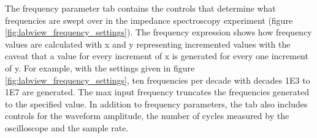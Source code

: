 \par The frequency parameter tab contains the controls that determine what frequencies are swept over in the impedance spectroscopy experiment (figure \ref{fig:labview_frequency_settings}). The frequency expression shows how frequency values are calculated with x and y representing incremented values with the caveat that a value for every increment of x is generated for every one increment of y. For example, with the settings given in figure \ref{fig:labview_frequency_settings}, ten frequencies per decade with decades 1E3 to 1E7 are generated. The max input frequency truncates the frequencies generated to the specified value. In addition to frequency parameters, the tab also includes controls for the waveform amplitude, the number of cycles measured by the oscilloscope and the sample rate. 

